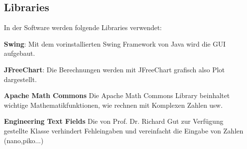\subsection{Libraries} \label{subsec:Libraries}

In der Software werden folgende Libraries verwendet:

\textbf{Swing}: Mit dem vorinstallierten Swing Framework von Java wird die GUI aufgebaut.

\textbf{JFreeChart}: Die Berechnungen werden mit JFreeChart grafisch also Plot dargestellt. \cite{jfreechart}

\textbf{Apache Math Commons} Die Apache Math Commons Library beinhaltet wichtige Mathematikfunktionen, wie rechnen mit Komplexen Zahlen usw. \cite{apache}

\textbf{Engineering Text Fields} Die von Prof. Dr. Richard Gut zur Verfügung gestellte Klasse verhindert Fehleingaben und vereinfacht die Eingabe von Zahlen (nano,piko...)

\newpage
